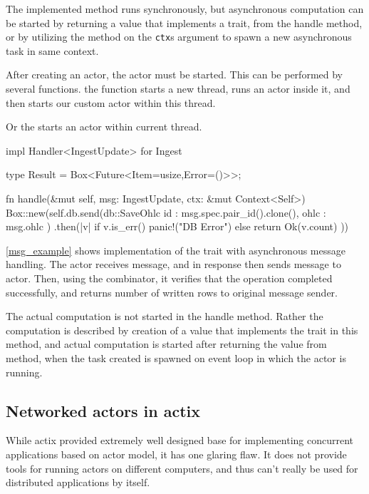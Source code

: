 The implemented  method runs synchronously, but asynchronous computation
can be started by returning a value that implements a   trait, from the handle method, or by utilizing the 
method on the \verb|ctx|s argument to spawn a new asynchronous task in same context.

After creating an actor, the actor must be started. This can be performed by several functions.
the  function starts a new thread, runs an  actor inside it, and then
starts our custom actor within this thread.

Or the  starts an actor within current thread.

\begin{code}[language=rust,label={msg_example},caption={Asynchronous message handling example}]
impl Handler<IngestUpdate> for Ingest {
    type Result = Box<Future<Item=usize,Error=()>>;

    fn handle(&mut self, msg: IngestUpdate, ctx: &mut Context<Self>) {
        Box::new(self.db.send(db::SaveOhlc{
            id : msg.spec.pair_id().clone(),
            ohlc : msg.ohlc
        })
        .then(|v| if v.is_err() { panic!("DB Error")} else { return Ok(v.count) }))
    }
}
\end{code}

\autoref{msg_example} shows implementation of the  trait with asynchronous message handling. The  actor receives  message,
and in response then sends  message to  actor. Then, using the  combinator, it
verifies that the operation completed successfully, and returns number of written rows to original message sender.

The actual computation is not started in the handle method. Rather the computation is described by creation
of a value that implements the  trait in this method, and actual computation is started after returning
the value from  method, when the task created is spawned on event loop in which the actor is running.


\subsection{Networked actors in actix}
While actix provided extremely well designed base for implementing concurrent applications based on actor model, it has
one glaring flaw. It does not provide tools for running actors on different computers, and thus can't really be used for
distributed applications by itself.

